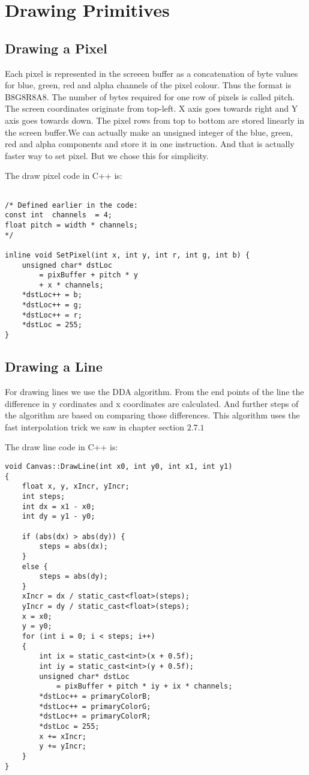 \chapter{Drawing Primitives}
\section{Drawing a Pixel}
Each pixel is represented in the screeen buffer as a concatenation of byte values for blue, green, red and alpha channels of the pixel colour. Thus the format is B8G8R8A8. The number of bytes required for one row of pixels is called pitch. The screen coordinates originate from top-left. X axis goes towards right and Y axis goes towards down. The pixel rows from top to bottom are stored linearly in the screen buffer.We can actually make an unsigned integer of the blue, green, red and alpha components and store it in one instruction. And that is actually faster way to set pixel. But we chose this for simplicity.

The draw pixel code in C++ is:\\
\lstset{style=cpp}
\begin{lstlisting}

/* Defined earlier in the code:
const int  channels  = 4;
float pitch = width * channels;
*/

inline void SetPixel(int x, int y, int r, int g, int b) {
	unsigned char* dstLoc 
		= pixBuffer + pitch * y 
		+ x * channels;
	*dstLoc++ = b;
	*dstLoc++ = g;
	*dstLoc++ = r;
	*dstLoc = 255;
}
\end{lstlisting}
\clearpage 

\section{Drawing a Line}
For drawing lines we use the DDA algorithm. From the end points of the line the difference in y cordinates and x coordinates are calculated. And further steps of the algorithm are based on comparing those differences. This algorithm uses the fast interpolation trick we saw in chapter section $2.7.1$

The draw line code in C++ is:\\
\lstset{style=cpp}
\begin{lstlisting}
void Canvas::DrawLine(int x0, int y0, int x1, int y1)
{
	float x, y, xIncr, yIncr;
	int steps;
	int dx = x1 - x0;
	int dy = y1 - y0;

	if (abs(dx) > abs(dy)) {
		steps = abs(dx);
	}
	else {
		steps = abs(dy);
	}
	xIncr = dx / static_cast<float>(steps);
	yIncr = dy / static_cast<float>(steps);
	x = x0;
	y = y0;
	for (int i = 0; i < steps; i++)
	{
		int ix = static_cast<int>(x + 0.5f);
		int iy = static_cast<int>(y + 0.5f);
		unsigned char* dstLoc 
			= pixBuffer + pitch * iy + ix * channels;
		*dstLoc++ = primaryColorB;
		*dstLoc++ = primaryColorG;
		*dstLoc++ = primaryColorR;
		*dstLoc = 255;
		x += xIncr;
		y += yIncr;
	}
}
\end{lstlisting}

